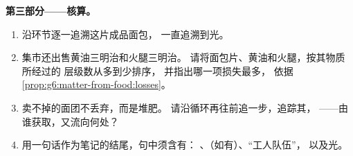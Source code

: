 \begin{problem}
\medskip\noindent\textbf{第三部分——核算。}
\begin{enumerate}[resume]
  \item 沿环节逐一追溯这片成品面包，
        一直追溯到光。
  \item 集市还出售黄油三明治和火腿三明治。
        请将面包片、黄油和火腿，按其物质所经过的
        层级数从多到少排序，
        并指出哪一项损失最多，
        依据\cref{prop:g6:matter-from-food:losses}。
  \item 卖不掉的面团不丢弃，而是堆肥。
        请沿循环再往前追一步，追踪其，
        ——由谁获取，又流向何处？
  \item 用一句话作为笔记的结尾，句中须含有：
        、（如有）、“工人队伍”，
        以及光。
\end{enumerate}
\end{problem}
